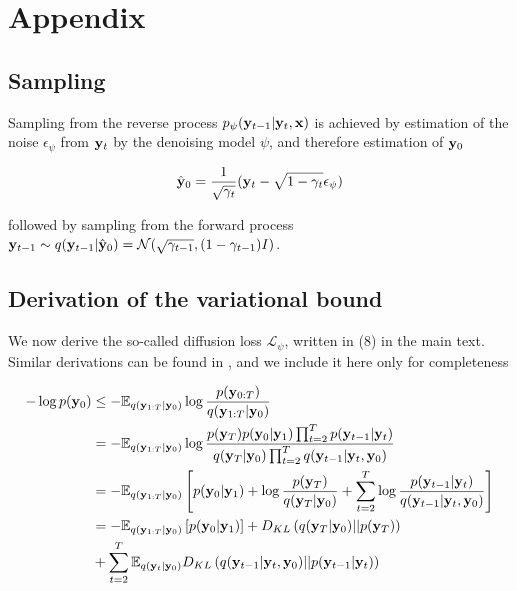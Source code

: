 \documentclass{article}
\begin{document}

 


\appendix

\section{Appendix}

\subsection{Sampling}

Sampling from the reverse process $p_{\psi}(\bold{y}_{t-1}|\bold{y}_{t},\bold{x})$ is achieved by estimation of the noise $\epsilon_{\psi}$ from $\bold{y}_{t}$ by the denoising model $\psi$, and therefore estimation of $\bold{y}_{0}$

\begin{equation}
\hat{\bold{y}}_{0} = \frac{1}{\sqrt{\gamma_{t}}}(\bold{y}_{t} - \sqrt{1-\gamma_{t}}\epsilon_{\psi})
\end{equation}

followed by sampling from the forward process $\bold{y}_{t-1} \sim q(\bold{y}_{t-1}|\hat{\bold{y}}_{0}) = \mathcal{N}(\sqrt{\gamma_{t-1}},(1-\gamma_{t-1})I)$. 


\subsection{Derivation of the variational bound}

We now derive the so-called diffusion loss $\mathcal{L}_{\psi}$, written in (8) in the main text. Similar derivations can be found in \citep{Kingma2021,Ribeiro2024}, and we include it here only for completeness

\begin{align*}
-\log p(\bold{y}_{0}) &\leq - \mathbb{E}_{q(\bold{y}_{1:T}|\bold{y}_{0})} \log \frac{p(\bold{y}_{0:T})}{q(\bold{y}_{1:T}|\bold{y}_{0})}\\
&= -\mathbb{E}_{q(\bold{y}_{1:T}|\bold{y}_{0})} \log \frac{p(\bold{y}_{T})p(\bold{y}_0|\bold{y}_1) \prod_{t=2}^{T}p(\bold{y}_{t-1}|\bold{y}_t)}{q(\bold{y}_T|\bold{y}_0)\prod_{t=2}^{T}q(\bold{y}_{t-1}|\bold{y}_t,\bold{y}_0)}\\
&= -\mathbb{E}_{q(\bold{y}_{1:T}|\bold{y}_{0})} \left[ p(\bold{y}_0|\bold{y}_1) + \log \frac{p(\bold{y}_{T})}{q(\bold{y}_T|\bold{y}_0)} + \sum_{t=2}^{T} \log \frac{p(\bold{y}_{t-1}|\bold{y}_t)}{q(\bold{y}_{t-1}|\bold{y}_t,\bold{y}_0)}\right]\\
&= -\mathbb{E}_{q(\bold{y}_{1:T}|\bold{y}_{0})} \left[ p(\bold{y}_0|\bold{y}_1)\right] + D_{KL}\left(q(\bold{y}_T|\bold{y}_0) \lvert\lvert p(\bold{y}_{T})\right) \\
&+ \sum_{t=2}^{T} \mathbb{E}_{q(\bold{y}_{t}|\bold{y}_{0})} D_{KL}\left(q(\bold{y}_{t-1}|\bold{y}_t,\bold{y}_0)\lvert\lvert p(\bold{y}_{t-1}|\bold{y}_t) \right)
\end{align*}
\end{document}
